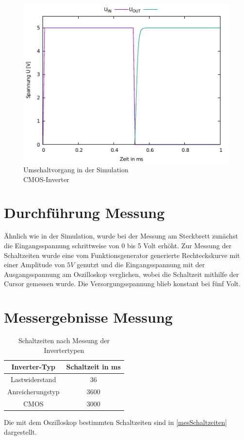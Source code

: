 \documentclass[11pt, a4paper]{article}
\begin{document}
\begin{figure}
    \centering
    \includegraphics[width=\linewidth]{simTimeCMOS.pdf}
    \caption{Umschaltvorgang in der Simulation \\ CMOS-Inverter}
    \label{simTimeCMOS}
\end{figure}
\section*{Durchführung Messung}
Ähnlich wie in der Simulation, wurde bei der Messung am Steckbrett zunächst die Eingangsspannung schrittweise von 0 bis 5 Volt erhöht. 
Zur Messung der Schaltzeiten wurde eine vom Funktionsgenerator generierte Rechteckskurve mit einer Amplitude von $5V$ genutzt und die Eingangsspannung mit der Ausgangsspannung am Oszilloskop verglichen, wobei die Schaltzeit mithilfe der Cursor gemessen wurde.
Die Versorgungsspannung blieb konstant bei fünf Volt.
\section*{Messergebnisse Messung}
\begin{table}[h]
\centering
\begin{tabular}{c|c}
Inverter-Typ & Schaltzeit in ms \\ \hline
Lastwiderstand & $36$ \\
Anreicherungstyp & $3600$ \\
CMOS & $3000$
\end{tabular}
\caption{Schaltzeiten nach Messung der Invertertypen}
\label{mesSchaltzeiten}
\end{table}
Die mit dem Oszilloskop bestimmten Schaltzeiten sind in \autoref{mesSchaltzeiten} dargestellt.
\end{document}

